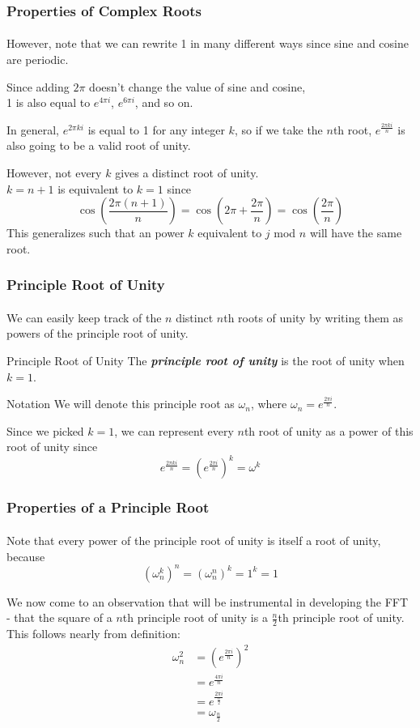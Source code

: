 \documentclass{beamer}                             %
\newcommand{\emphasis}[1]{\textbf{\textit{#1}}}
\begin{document}
\begin{frame}
\frametitle{Properties of Complex Roots}
\framesubtitle{}
However, note that we can rewrite 1 in many different ways
since sine and cosine are periodic. \pause

Since adding \( 2 \pi \) doesn't change the value of sine and cosine, \\
1 is also equal to \( e^{4 \pi i} \), \( e^{6 \pi i} \), and so on. \pause

In general, \( e^{2 \pi k i} \) is equal to 1 for any integer \( k \), so if we
take the \( n \)th root, \( e^{\frac{2 \pi k i}{n}} \)
is also going to be a valid root of unity. \pause 

However, not every \( k \) gives a distinct root of unity. \\
\( k = n + 1 \) is equivalent to \( k = 1 \) since
\[ \cos(\frac{2 \pi(n + 1)}{n}) = \cos(2 \pi + \frac{2 \pi}{n})
= \cos(\frac{2 \pi}{n}) \]
This generalizes such that an power \( k \) equivalent to \( j \) mod \( n \)
will have the same root.
\end{frame}

\begin{frame}
\frametitle{Principle Root of Unity}
\framesubtitle{}
We can easily keep track of the \( n \) distinct \( n \)th roots of unity by 
writing them as powers of the \alert{principle root of unity}.
\begin{alertblock}{Principle Root of Unity}
The \emphasis{principle root of unity} is the root of unity when \( k = 1 \).
\end{alertblock} \pause
\begin{block}{Notation}
We will denote this principle root as \( \omega_n \), where
\( \omega_n = e^{\frac{2 \pi i}{n}} \).
\end{block} \pause
Since we picked \( k = 1 \), we can represent every \( n \)th root of unity as 
a power of this root of unity since 
\[ e^{\frac{2 \pi k i}{n}} = (e^{\frac{2 \pi i}{n}})^k = \omega^k \] 
\end{frame}

\begin{frame}
\frametitle{Properties of a Principle Root}
\framesubtitle{}
Note that every power of the principle root of unity is itself a root of unity,
because \[ (\omega^k_n)^n = (\omega^n_n)^k = 1^k = 1 \] \pause 

We now come to an observation that will be instrumental in developing the FFT -
that the square of a \( n \)th principle root of unity is a \( \frac{n}{2} \)th
principle root of unity. \\
This follows nearly from definition:
\begin{align*}
  \omega_n^2 &= (e^{\frac{2 \pi i}{n}})^2 \\
             &= e^{\frac{4 \pi i}{n}} \\
             &= e^{\frac{2 \pi i}{\frac{n}{2}}} \\
             &= \omega_{\frac{n}{2}}
\end{align*}
\end{frame}
\end{document}
